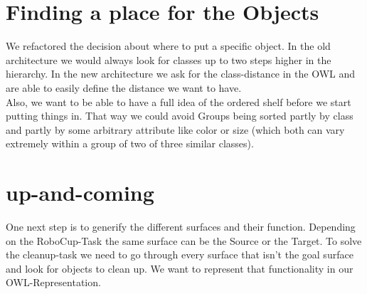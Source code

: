 \documentclass[main.tex]{subfiles}
\begin{document}
		\section{Finding a place for the Objects}
		We refactored the decision about where to put a specific object. In the old architecture we would always look for classes up to two steps higher in the hierarchy. In the new architecture we ask for the class-distance in the OWL and are able to easily define the distance we want to have.\\
Also, we want to be able to have a full idea of the ordered shelf before we start putting things in. That way we could avoid Groups being sorted partly by class and partly by some arbitrary attribute like color or size (which both can vary extremely within a group of two of three similar classes). 

		\section{up-and-coming}
		One next step is to generify the different surfaces and their function. Depending on the RoboCup-Task the same surface can be the Source or the Target. To solve the cleanup-task we need to go through every surface that isn't the goal surface and look for objects to clean up. We want to represent that functionality in our OWL-Representation. 
\end{document}
